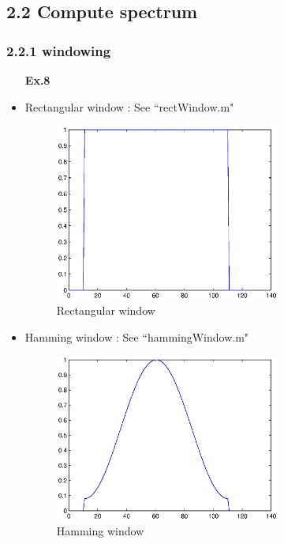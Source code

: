 \documentclass[a4paper]{article}
\begin{document}
\subsection*{2.2 Compute spectrum}
\subsubsection*{2.2.1 windowing}

\begin{itemize}
	\item[\textbf{Ex.8}]
	\item Rectangular window : See ``rectWindow.m"
	\begin{figure}[H]
		\begin{center}
			\includegraphics[width=0.7\textwidth]{ex8_1.eps}
			\caption{Rectangular window}\label{fig:rectw}		
		\end{center}
	\end{figure}
	
	\item Hamming window : See ``hammingWindow.m"
		\begin{figure}[H]
			\begin{center}
				\includegraphics[width=0.7\textwidth]{ex8_2.eps}
				\caption{Hamming window}\label{fig:hammw}		
			\end{center}
		\end{figure}
		
\end{itemize}
\end{document}
